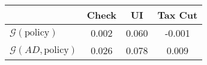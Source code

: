 \begin{tabular}{@{}lccc@{}}
\toprule
                          & Check      & UI    & Tax Cut    \\  \midrule
$\mathcal{G}(\text{policy})$ & 0.002  & 0.060  & -0.001     \\
$\mathcal{G}(AD,\text{policy})$ & 0.026  & 0.078  & 0.009     \\
\end{tabular}
